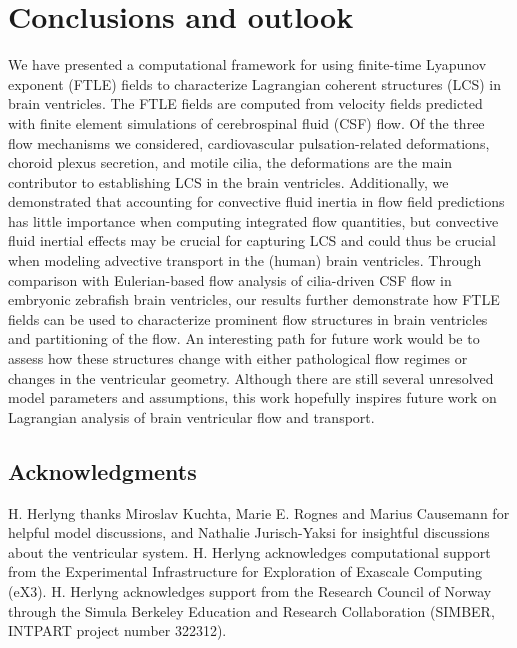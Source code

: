 \documentclass{template}
\begin{document}
\section{Conclusions and outlook}
We have presented a computational framework for using finite-time Lyapunov exponent (FTLE)
fields to characterize Lagrangian coherent structures (LCS) in brain ventricles.
The FTLE fields are computed from velocity fields predicted with finite element simulations
of cerebrospinal fluid (CSF) flow. Of the three flow mechanisms we considered, cardiovascular pulsation-related
deformations, choroid plexus secretion, and motile cilia, the deformations are the main contributor to
establishing LCS in the brain ventricles. Additionally,
we demonstrated that accounting for convective fluid inertia
in flow field predictions has little importance when computing integrated flow quantities,
but convective fluid inertial effects may be crucial for capturing LCS and
could thus be crucial when modeling advective transport in the (human) brain ventricles.
Through comparison with Eulerian-based flow analysis of cilia-driven CSF flow in
embryonic zebrafish brain ventricles, our results further
demonstrate how FTLE fields can be used to characterize prominent flow structures in brain ventricles
and partitioning of the flow.
An interesting path for future work would be to assess how these structures change
with either pathological flow regimes or changes in the ventricular geometry.
Although there are still several unresolved model parameters and assumptions,
this work hopefully inspires future work on Lagrangian analysis of brain ventricular flow and transport.

\subsection*{Acknowledgments}
H. Herlyng thanks Miroslav Kuchta, Marie E. Rognes
and Marius Causemann for helpful model discussions,
and Nathalie Jurisch-Yaksi for
insightful discussions about the ventricular system.
H. Herlyng acknowledges computational support from the
Experimental Infrastructure for Exploration of Exascale
Computing (eX3). H. Herlyng acknowledges support from
the Research Council of Norway through 
the Simula Berkeley Education and Research Collaboration
(SIMBER, INTPART project number 322312).

\end{document}
